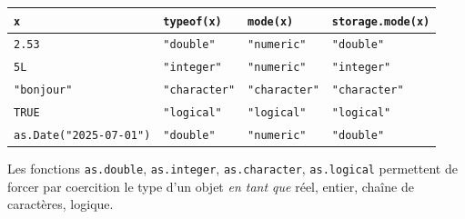 \documentclass[
]{book}
\begin{document}
\begin{longtable}[]{@{}
  >{\centering\arraybackslash}p{}
  >{\centering\arraybackslash}p{}
  >{\centering\arraybackslash}p{}
  >{\centering\arraybackslash}p{}@{}}
\toprule\noalign{}
\begin{minipage}[b]{\linewidth}\centering
\texttt{x}
\end{minipage} & \begin{minipage}[b]{\linewidth}\centering
\texttt{typeof(x)}
\end{minipage} & \begin{minipage}[b]{\linewidth}\centering
\texttt{mode(x)}
\end{minipage} & \begin{minipage}[b]{\linewidth}\centering
\texttt{storage.mode(x)}
\end{minipage} \\
\midrule\noalign{}
\endhead
\bottomrule\noalign{}
\endlastfoot
\texttt{2.53} & \texttt{"double"} & \texttt{"numeric"} & \texttt{"double"} \\
\texttt{5L} & \texttt{"integer"} & \texttt{"numeric"} & \texttt{"integer"} \\
\texttt{"bonjour"} & \texttt{"character"} & \texttt{"character"} & \texttt{"character"} \\
\texttt{TRUE} & \texttt{"logical"} & \texttt{"logical"} & \texttt{"logical"} \\
\texttt{as.Date("2025-07-01")} & \texttt{"double"} & \texttt{"numeric"} & \texttt{"double"} \\
\end{longtable}

Les fonctions \texttt{as.double}, \texttt{as.integer}, \texttt{as.character}, \texttt{as.logical} permettent de forcer par coercition le type d'un objet \emph{en tant que} réel, entier, chaîne de caractères, logique.
\end{document}
